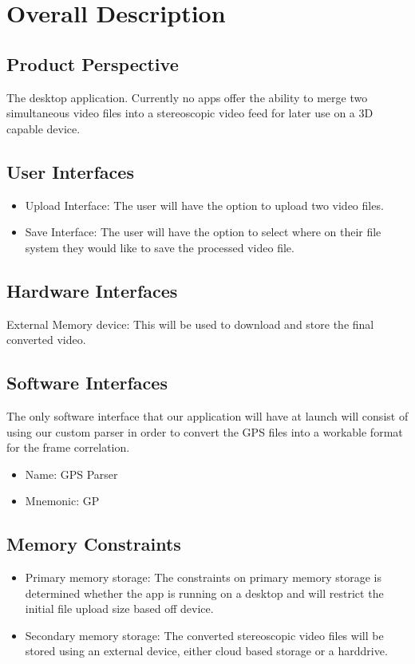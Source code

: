 \documentclass[10pt,letterpaper,onecolumn]{article}
\begin{document}
\section{Overall Description}
\subsection{Product Perspective}
The desktop application. Currently no apps offer the ability to merge two simultaneous video files into a stereoscopic video feed for later use on a 3D capable device.

\subsection{User Interfaces}
\begin{itemize}
  \item Upload Interface: The user will have the option to upload two video files.
  \item Save Interface: The user will have the option to select where on their file system they would like to save the processed video file.
\end{itemize}

\subsection{Hardware Interfaces}
External Memory device: This will be used to download and store the final converted video.

\subsection{Software Interfaces}
The only software interface that our application will have at launch will consist of using our custom parser in order to convert the GPS files into a workable format for the frame correlation.
\begin{itemize}
  \item Name: GPS Parser
  \item Mnemonic: GP
\end{itemize}

\subsection{Memory Constraints}
\begin{itemize}
  \item Primary memory storage: The constraints on primary memory storage is determined whether the app is running on a desktop and will restrict the initial file upload size based off device.
  \item Secondary memory storage: The converted stereoscopic video files will be stored using an external device, either cloud based storage or a harddrive.
\end{itemize}
\end{document}
